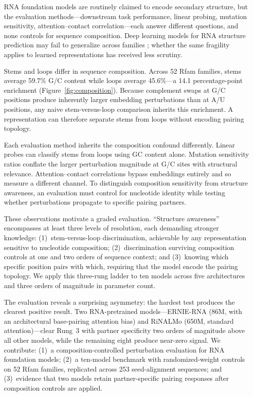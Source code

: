 \documentclass[11pt]{article}
\begin{document}
RNA foundation models are routinely claimed to encode secondary structure,
but the evaluation methods---downstream task performance, linear probing,
mutation sensitivity, attention--contact correlation---each answer different
questions, and none controls for sequence composition. Deep learning models
for RNA structure prediction may fail to generalize across families
\citep{szikszai2022generalization}; whether the same fragility applies to
learned representations has received less scrutiny.

Stems and loops differ in sequence composition. Across 52 Rfam families,
stems average 59.7\% G/C content while loops average 45.6\%---a 14.1
percentage-point enrichment (Figure~\ref{fig:composition}). Because complement swaps at G/C positions
produce inherently larger embedding perturbations than at A/U positions,
any naive stem-versus-loop comparison inherits this enrichment. A
representation can therefore separate stems from loops without encoding
pairing topology.

Each evaluation method inherits the composition confound differently.
Linear probes can classify stems from loops using GC content alone.
Mutation sensitivity ratios conflate the larger perturbation magnitude at
G/C sites with structural relevance. Attention--contact correlations
bypass embeddings entirely and so measure a different channel. To
distinguish composition sensitivity from structure awareness, an
evaluation must control for nucleotide identity while testing whether
perturbations propagate to specific pairing partners.

These observations motivate a graded evaluation.
``Structure awareness'' encompasses at least three levels of
resolution, each demanding stronger knowledge: (1)~stem-versus-loop
discrimination, achievable by any representation sensitive to
nucleotide composition; (2)~discrimination surviving composition
controls at one and two orders of sequence context; and (3)~knowing
which specific position pairs with which, requiring that the model
encode the pairing topology. We apply this three-rung ladder to ten models across five architectures
and three orders of magnitude in parameter count.

The evaluation reveals a surprising asymmetry: the hardest test
produces the clearest positive result. Two RNA-pretrained
models---ERNIE-RNA (86M, with an architectural base-pairing attention
bias) and RiNALMo (650M, standard attention)---clear Rung~3 with
partner specificity two orders of magnitude above all other models,
while the remaining eight produce near-zero signal. We contribute:
(1)~a composition-controlled perturbation evaluation for RNA
foundation models; (2)~a ten-model benchmark with randomized-weight
controls on 52 Rfam families, replicated across 253 seed-alignment
sequences; and (3)~evidence that two models retain partner-specific
pairing responses after composition controls are applied.
\end{document}

